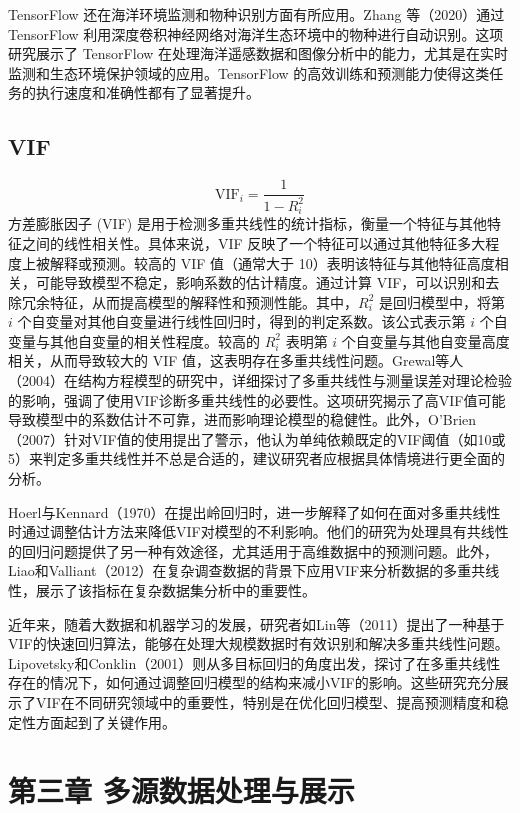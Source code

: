 \documentclass{article}
\begin{document}
	TensorFlow 还在海洋环境监测和物种识别方面有所应用。Zhang 等（2020）通过 TensorFlow 利用深度卷积神经网络对海洋生态环境中的物种进行自动识别\cite{zhang2020}。这项研究展示了 TensorFlow 在处理海洋遥感数据和图像分析中的能力，尤其是在实时监测和生态环境保护领域的应用。TensorFlow 的高效训练和预测能力使得这类任务的执行速度和准确性都有了显著提升。
	
	\subsection{VIF}
	
	\[
	\text{VIF}_i = \frac{1}{1 - R_i^2}
	\]
	方差膨胀因子 (VIF) 是用于检测多重共线性的统计指标，衡量一个特征与其他特征之间的线性相关性。具体来说，VIF 反映了一个特征可以通过其他特征多大程度上被解释或预测。较高的 VIF 值（通常大于 10）表明该特征与其他特征高度相关，可能导致模型不稳定，影响系数的估计精度。通过计算 VIF，可以识别和去除冗余特征，从而提高模型的解释性和预测性能。其中，$R_i^2$ 是回归模型中，将第 $i$ 个自变量对其他自变量进行线性回归时，得到的判定系数。该公式表示第 $i$ 个自变量与其他自变量的相关性程度。较高的 $R_i^2$ 表明第 $i$ 个自变量与其他自变量高度相关，从而导致较大的 VIF 值，这表明存在多重共线性问题。Grewal等人（2004）在结构方程模型的研究中，详细探讨了多重共线性与测量误差对理论检验的影响，强调了使用VIF诊断多重共线性的必要性\cite{grewal2004}。这项研究揭示了高VIF值可能导致模型中的系数估计不可靠，进而影响理论模型的稳健性。此外，O’Brien（2007）针对VIF值的使用提出了警示，他认为单纯依赖既定的VIF阈值（如10或5）来判定多重共线性并不总是合适的，建议研究者应根据具体情境进行更全面的分析\cite{obrien2007}。
	
	Hoerl与Kennard（1970）在提出岭回归时，进一步解释了如何在面对多重共线性时通过调整估计方法来降低VIF对模型的不利影响\cite{hoerl1970}。他们的研究为处理具有共线性的回归问题提供了另一种有效途径，尤其适用于高维数据中的预测问题。此外，Liao和Valliant（2012）在复杂调查数据的背景下应用VIF来分析数据的多重共线性，展示了该指标在复杂数据集分析中的重要性\cite{liao2012}。
	
	近年来，随着大数据和机器学习的发展，研究者如Lin等（2011）提出了一种基于VIF的快速回归算法，能够在处理大规模数据时有效识别和解决多重共线性问题\cite{lin2011}。Lipovetsky和Conklin（2001）则从多目标回归的角度出发，探讨了在多重共线性存在的情况下，如何通过调整回归模型的结构来减小VIF的影响\cite{lipovetsky2001}。这些研究充分展示了VIF在不同研究领域中的重要性，特别是在优化回归模型、提高预测精度和稳定性方面起到了关键作用。
	
	
	\section{第三章 多源数据处理与展示}
	
\end{document}
